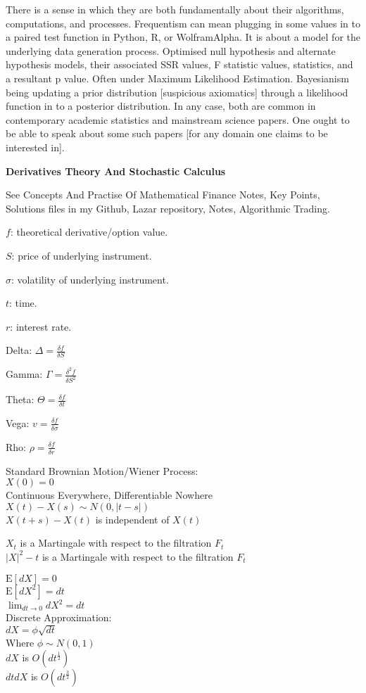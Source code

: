 There is a sense in which they are both fundamentally about their algorithms, computations, and processes. Frequentism can mean plugging in some values in to a paired test function in Python, R, or WolframAlpha. It is about a model for the underlying data generation process. Optimised null hypothesis and alternate hypothesis models, their associated SSR values, F statistic values, statistics, and a resultant p value. Often under Maximum Likelihood Estimation. Bayesianism being updating a prior distribution [suspicious axiomatics] through a likelihood function in to a posterior distribution. In any case, both are common in contemporary academic statistics and mainstream science papers. One ought to be able to speak about some such papers [for any domain one claims to be interested in].

\newpage

\textbf{Derivatives Theory And Stochastic Calculus}

See Concepts And Practise Of Mathematical Finance Notes, Key Points, Solutions files in my Github, Lazar repository, Notes, Algorithmic Trading.

$f$: theoretical derivative/option value.

$S$: price of underlying instrument.

$\sigma$: volatility of underlying instrument.

$t$: time.

$r$: interest rate.

Delta: $\Delta = \frac{\delta f}{\delta S}$

Gamma: $\Gamma = \frac{\delta^2 f}{\delta S^2}$

Theta: $\Theta = \frac{\delta f}{\delta t}$

Vega: $v = \frac{\delta f}{\delta \sigma}$

Rho: $\rho = \frac{\delta f}{\delta r}$

Standard Brownian Motion/Wiener Process: \\
$X(0)=0$ \\
Continuous Everywhere, Differentiable Nowhere \\
$X(t)-X(s) \sim N(0,|t-s|)$ \\
$X(t+s)-X(t)$ is independent of $X(t)$

$X_t$ is a Martingale with respect to the filtration $F_t$ \\
$|X|^2-t$ is a Martingale with respect to the filtration $F_t$

$\text{E}[dX]=0$ \\
$\text{E}[dX^2]=dt$ \\
$\lim_{dt \to 0}dX^2=dt$ \\
Discrete Approximation: \\
$dX=\phi \sqrt{dt}$ \\
Where $\phi \sim N(0,1)$ \\
$dX$ is $O(dt^{\frac{1}{2}})$ \\
$dtdX$ is $O(dt^{\frac{3}{2}})$

